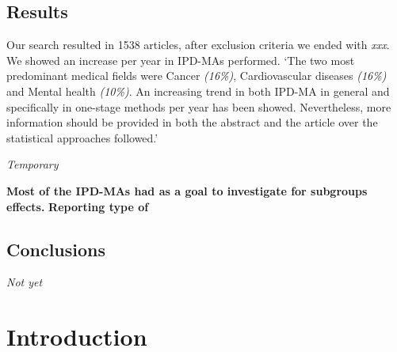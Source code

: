 \documentclass[]{article}
\begin{document}
\hypertarget{results}{%
\subsection{Results}\label{results}}

Our search resulted in 1538 articles, after exclusion criteria we ended
with \emph{xxx}. We showed an increase per year in IPD-MAs performed.
`The two most predominant medical fields were Cancer \emph{(16\%)},
Cardiovascular diseases \emph{(16\%)} and Mental health \emph{(10\%)}.
An increasing trend in both IPD-MA in general and specifically in
one-stage methods per year has been showed. Nevertheless, more
information should be provided in both the abstract and the article over
the statistical approaches followed.'

\emph{Temporary}

\textbf{Most of the IPD-MAs had as a goal to investigate for subgroups
effects.} \textbf{Reporting type of }

\hypertarget{conclusions}{%
\subsection{Conclusions}\label{conclusions}}

\emph{Not yet}

\newpage

\hypertarget{introduction}{%
\section{Introduction}\label{introduction}}
\end{document}
